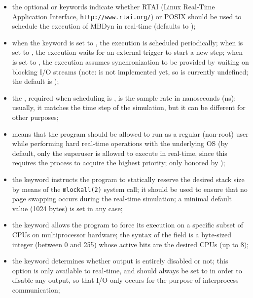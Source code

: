 \begin{itemize}
\item the optional  or  keywords indicate whether
RTAI (Linux Real-Time Application Interface, \texttt{http://www.rtai.org/})
or POSIX should be used to schedule the execution of MBDyn in real-time
(defaults to );

\item when the keyword  is set to , the execution
is scheduled periodically; when  is set to ,
the execution waits for an external trigger to start a new step;
when  is set to , the execution assumes synchronization
to be provided by waiting on blocking I/O streams
(note:  is not implemented yet,
so  is currently undefined;
the default  is );

\item the , required when scheduling is ,
is the sample rate in nanoseconds (ns); 
usually, it matches the time step of the simulation,
but it can be different for other purposes;

\item {} means that the program should be allowed to run
as a regular (non-root) user while performing hard real-time operations
with the underlying OS (by default, only the superuser is allowed
to execute in real-time, since this requires the process to acquire
the highest priority; only honored by );

\item the keyword  instructs the program 
to statically reserve the desired stack size by means 
of the \texttt{mlockall(2)} system call; it should be used to ensure 
that no page swapping occurs during the real-time simulation;
a minimal default value (1024 bytes) is set in any case;

\item the keyword  allows the program to force its
execution on a specific subset of CPUs on multiprocessor hardware;
the syntax of the  field is a byte-sized integer 
(between 0 and 255) whose active bits are the desired CPUs (up to 8);

\item the keyword  determines whether output is entirely disabled
or not; this option is only available to  real-time,
and should always be set to  in order to disable any output,
so that I/O only occurs for the purpose of interprocess communication;


\end{itemize}
